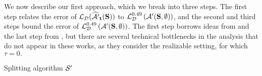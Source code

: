 We now describe our first approach,
which we break into three steps.  The first step relates the error of  $ \operatorname{\mathcal{L}}_{\mathcal{D}}(\widehat{\mathcal{A}'}_{\mathbf{t}}(\mathbf{S})) $ to $ \operatorname{\mathcal{L}}_{\mathcal{D}}^{0.49}\left(\mathcal{A}'(\mathbf{S},\emptyset)\right) $, and the second and third steps bound the error of $ \operatorname{\mathcal{L}}_{\mathcal{D}}^{0.49}\left(\mathcal{A}'(\mathbf{S},\emptyset)\right) $. The first step borrows ideas from \citet{baggingoptimal} and the last step from \citet{hanneke2016optimal}, but there are
several technical bottlenecks in the analysis that do 
not appear in these works, as they  
consider the realizable setting, for which $\tau = 0.$

\begin{algorithm}
\caption{Splitting algorithm $\mathcal{S}'$}\label{alg:splittingwith3}
\end{algorithm}


{}

